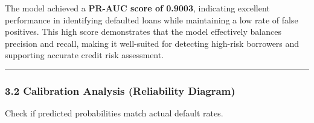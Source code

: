\documentclass[11pt]{article}
\begin{document}
The model achieved a \textbf{PR-AUC score of 0.9003}, indicating
excellent performance in identifying defaulted loans while maintaining a
low rate of false positives. This high score demonstrates that the model
effectively balances precision and recall, making it well-suited for
detecting high-risk borrowers and supporting accurate credit risk
assessment.

    \begin{center}\rule{0.5\linewidth}{0.5pt}\end{center}

\subsubsection{3.2 Calibration Analysis (Reliability
Diagram)}\label{calibration-analysis-reliability-diagram}

Check if predicted probabilities match actual default rates.
\end{document}
